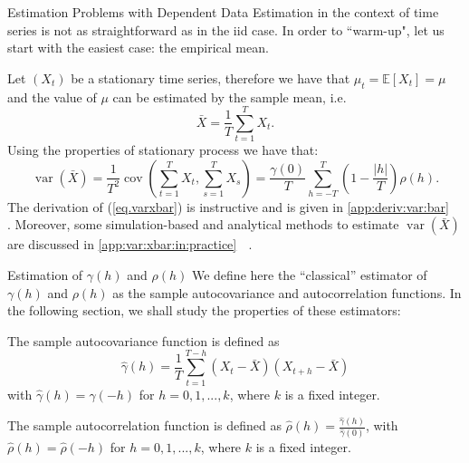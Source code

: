\documentclass[envcountsect,usenames,dvipsnames]{beamer}
\DeclareMathOperator*{\cov}{cov}
\DeclareMathOperator*{\var}{var}
\theoremstyle{mystyle}
\begin{document}
\begin{frame}{Estimation Problems with Dependent Data}
\small
Estimation in the context of time series is not as straightforward as in the iid case. In order to ``warm-up", let us start with the easiest case: the empirical mean.

	\vspace{0.25cm}
		Let $(X_t)$ be a stationary time series, therefore we have that $\mu_t = \mathbb{E}[X_t] = \mu$ and the value of $\mu$ can be estimated by the sample mean, i.e.
		\begin{equation*}
			\bar{X} = \frac{1}{T} \sum_{t = 1}^T X_t.
		\end{equation*}
		Using the properties of stationary process we have that:
		\begin{equation}
			\var \left(\bar{X}\right) = \frac{1}{T^2} \cov \left( \sum_{t = 1}^T X_t, \sum_{s = 1}^T X_s \right) = \frac{\gamma(0)}{T} \sum_{h = -T}^T \left(1 - \frac{|h|}{T}\right) \rho(h).
			\label{eq.varxbar}
		\end{equation}
The derivation of (\ref{eq.varxbar}) is instructive and is given in \ref{app:deriv:var:bar} $\;$ \hyperlink{app:strong:weak}{}. Moreover, some simulation-based and analytical methods to estimate $\var \left(\bar{X}\right)$ are discussed in \ref{app:var:xbar:in:practice} $\;$ \hyperlink{app:var:xbar:in:practice}{}.
\end{frame}



\begin{frame}{Estimation of $\gamma(h)$ and $\rho(h)$}
	\footnotesize
	We define here the ``classical'' estimator of $\gamma(h)$ and $\rho(h)$ as the sample autocovariance and autocorrelation functions. In the following section, we shall study the properties of these estimators:
	
	\begin{Definition}
	\label{def:sample:auto:cov}
		The {sample autocovariance function} is defined as
		\begin{equation*}
			\hat{\gamma}(h) = \frac{1}{T} \sum_{t = 1}^{T-h} \left(X_{t} - \bar{X}\right) \left(X_{t+h} - \bar{X}\right)
		\end{equation*}
		with $\hat{\gamma}(h) = \hat{\gamma}(-h)$ for $h = 0, 1, ..., k$, where $k$ is a fixed integer.
	\end{Definition}
	
	\begin{Definition}
	\label{def:sample:auto:cor}
		The {sample autocorrelation function} is defined as
		$\hat{\rho}(h) = \frac{\hat{\gamma}(h)}{\hat{\gamma}(0)}$,
		with $\hat{\rho}(h) = \hat{\rho}(-h)$ for $h = 0, 1, ..., k$, where $k$ is a fixed integer.
	\end{Definition}
	
\end{frame}
\end{document}
